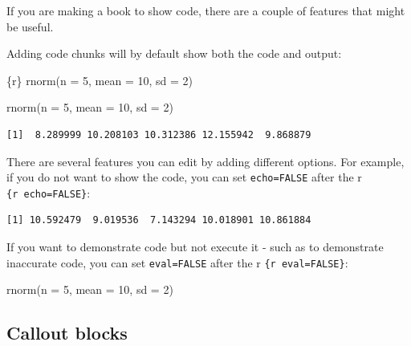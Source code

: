 \documentclass[
  letterpaper,
  DIV=11,
  numbers=noendperiod]{scrreprt}
\newenvironment{Shaded}{\begin{snugshade}}{\end{snugshade}}
\newcommand{\AttributeTok}[1]{\textcolor[rgb]{0.40,0.45,0.13}{#1}}
\newcommand{\DecValTok}[1]{\textcolor[rgb]{0.68,0.00,0.00}{#1}}
\newcommand{\FunctionTok}[1]{\textcolor[rgb]{0.28,0.35,0.67}{#1}}
\newcommand{\InformationTok}[1]{\textcolor[rgb]{0.37,0.37,0.37}{#1}}
\newcommand{\NormalTok}[1]{\textcolor[rgb]{0.00,0.23,0.31}{#1}}
\begin{document}
If you are making a book to show code, there are a couple of features
that might be useful.

Adding code chunks will by default show both the code and output:

\begin{Shaded}
\begin{Highlighting}[]
\InformationTok{\textasciigrave{}\textasciigrave{}\textasciigrave{}\{r\}}
\InformationTok{rnorm(n = 5, mean = 10, sd = 2)}
\InformationTok{\textasciigrave{}\textasciigrave{}\textasciigrave{}}
\end{Highlighting}
\end{Shaded}

\begin{Shaded}
\begin{Highlighting}[]
\FunctionTok{rnorm}\NormalTok{(}\AttributeTok{n =} \DecValTok{5}\NormalTok{, }\AttributeTok{mean =} \DecValTok{10}\NormalTok{, }\AttributeTok{sd =} \DecValTok{2}\NormalTok{)}
\end{Highlighting}
\end{Shaded}

\begin{verbatim}
[1]  8.289999 10.208103 10.312386 12.155942  9.868879
\end{verbatim}

There are several features you can edit by adding different options. For
example, if you do not want to show the code, you can set
\texttt{echo=FALSE} after the r \texttt{\{r\ echo=FALSE\}}:

\begin{verbatim}
[1] 10.592479  9.019536  7.143294 10.018901 10.861884
\end{verbatim}

If you want to demonstrate code but not execute it - such as to
demonstrate inaccurate code, you can set \texttt{eval=FALSE} after the r
\texttt{\{r\ eval=FALSE\}}:

\begin{Shaded}
\begin{Highlighting}[]
\FunctionTok{rnorm}\NormalTok{(}\AttributeTok{n =} \DecValTok{5}\NormalTok{, }\AttributeTok{mean =} \DecValTok{10}\NormalTok{, }\AttributeTok{sd =} \DecValTok{2}\NormalTok{)}
\end{Highlighting}
\end{Shaded}

\subsection{Callout blocks}\label{callout-blocks}
\end{document}
